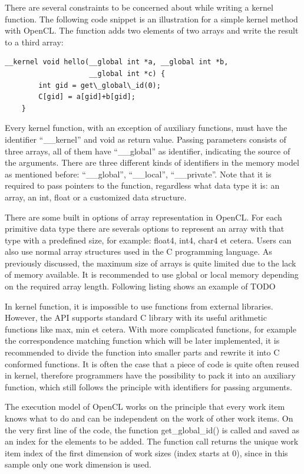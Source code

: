 There are several constraints to be concerned about while writing a kernel function. The following code snippet is an illustration for a simple kernel method with OpenCL. The function adds two elements of two arrays and write the result to a third array:
\begin{lstlisting}
__kernel void hello(__global int *a, __global int *b, 
					__global int *c) {
        int gid = get\_global\_id(0);
        C[gid] = a[gid]+b[gid];
    }

\end{lstlisting}

Every kernel function, with an exception of auxiliary functions, must have the identifier “\_\_kernel” and void as return value. Passing parameters consists of three arrays, all of them have “\_\_global” as identifier, indicating the source of the arguments. There are three different kinds of identifiers in the memory model as mentioned before: “\_\_global”, “\_\_local”, “\_\_private”. Note that it is required to pass pointers to the function, regardless what data type it is: an array, an int, float or a customized data structure.

There are some built in options of array representation in OpenCL. For each primitive data type there are severals options to represent an array with that type with a predefined size, for example: float4, int4, char4 et cetera. Users can also use normal array structures used in the C programming language.  As previously discussed, the maximum size of arrays is quite limited due to the lack of memory available. It is recommended to use global or local memory depending on the required array length. Following listing shows an example of TODO

In kernel function, it is impossible to use functions from external libraries. However, the API supports standard C library with its useful arithmetic functions like max, min et cetera. With more complicated functions, for example the correspondence matching function which will be later implemented, it is recommended to divide the function into smaller parts and rewrite it into C conformed functions. It is often the case that a piece of code is quite often reused in kernel, therefore programmers have the possibility to pack it into an auxiliary function, which still follows the principle with identifiers for passing arguments.

The execution model of OpenCL works on the principle that every work item knows what to do and can be independent on the work of other work items. On the very first line of the code, the function get\_global\_id() is called and saved as an index for the elements to be added. The function call returns the unique work item index of the first dimension of work sizes (index starts at 0), since in this sample only one work dimension is used.

